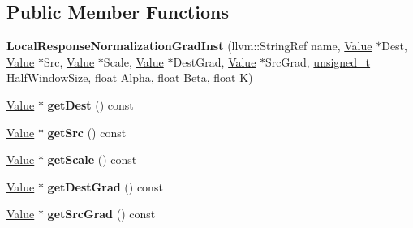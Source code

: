 \subsection*{Public Member Functions}
\begin{DoxyCompactItemize}
\item 
\mbox{\label{classglow_1_1_local_response_normalization_grad_inst_a94e2e42e2611f8927add034c53a20e6f}} 
{\bfseries Local\+Response\+Normalization\+Grad\+Inst} (llvm\+::\+String\+Ref name, \hyperlink{classglow_1_1_value}{Value} $\ast$Dest, \hyperlink{classglow_1_1_value}{Value} $\ast$Src, \hyperlink{classglow_1_1_value}{Value} $\ast$Scale, \hyperlink{classglow_1_1_value}{Value} $\ast$Dest\+Grad, \hyperlink{classglow_1_1_value}{Value} $\ast$Src\+Grad, \hyperlink{namespaceglow_a0ca574644e1e42ef193a9947fb4d8911}{unsigned\+\_\+t} Half\+Window\+Size, float Alpha, float Beta, float K)
\item 
\mbox{\label{classglow_1_1_local_response_normalization_grad_inst_ab8a62ad0340d8013b9842c8670db1f8a}} 
\hyperlink{classglow_1_1_value}{Value} $\ast$ {\bfseries get\+Dest} () const
\item 
\mbox{\label{classglow_1_1_local_response_normalization_grad_inst_ad40db567f3bc3b387ca7f045eb4bf833}} 
\hyperlink{classglow_1_1_value}{Value} $\ast$ {\bfseries get\+Src} () const
\item 
\mbox{\label{classglow_1_1_local_response_normalization_grad_inst_aab2c490bd6d88f965a25c3eb90c6d841}} 
\hyperlink{classglow_1_1_value}{Value} $\ast$ {\bfseries get\+Scale} () const
\item 
\mbox{\label{classglow_1_1_local_response_normalization_grad_inst_ad112636f174eb589aaf6c8dcce20c034}} 
\hyperlink{classglow_1_1_value}{Value} $\ast$ {\bfseries get\+Dest\+Grad} () const
\item 
\mbox{\label{classglow_1_1_local_response_normalization_grad_inst_a982940bbdca0997463b0ebfe1eb300dc}} 
\hyperlink{classglow_1_1_value}{Value} $\ast$ {\bfseries get\+Src\+Grad} () const

\end{DoxyCompactItemize}
